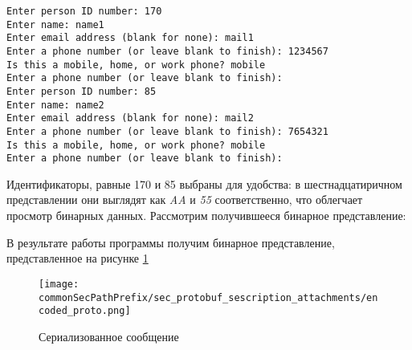 \begin{lstlisting}[style=CodeListing]
Enter person ID number: 170
Enter name: name1
Enter email address (blank for none): mail1
Enter a phone number (or leave blank to finish): 1234567
Is this a mobile, home, or work phone? mobile
Enter a phone number (or leave blank to finish):
Enter person ID number: 85
Enter name: name2
Enter email address (blank for none): mail2
Enter a phone number (or leave blank to finish): 7654321
Is this a mobile, home, or work phone? mobile
Enter a phone number (or leave blank to finish):
\end{lstlisting}

Идентификаторы, равные 170 и 85 выбраны для удобства: в шестнадцатиричном представлении они выглядят как \textit{AA} и \textit{55} соответственно, что облегчает просмотр бинарных данных.
Рассмотрим получившееся бинарное представление:

В результате работы программы получим бинарное представление, представленное на рисунке \ref{fig:encoded_proto}
\begin{figure}[ht]
    \centering
    \texttt{[image: \\commonSecPathPrefix/sec\_protobuf\_sescription\_attachments/encoded\_proto.png]}
    \caption{Сериализованное сообщение}
    \label{fig:encoded_proto}
\end{figure}

